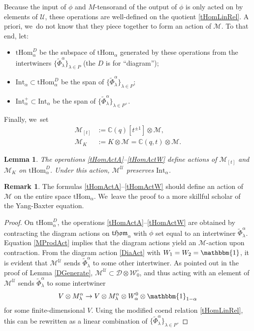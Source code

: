 \documentclass[JEP,XML,SOM,Unicode,published]{cedram}
\newtheorem{lem}[thm]{Lemma}
\theoremstyle{definition}
\newtheorem{rem}[thm]{Remark}
\newcommand{\CC}{\mathbb{C}}
\newcommand{\UU}{\mathcal{U}}
\newcommand{\DD}{\mathcal{D}}
\newcommand{\WW}{\mathcal{W}}
\newcommand{\WWo}{\WW^\circ}
\newcommand{\MM}{\mathcal{M}}
\begin{document}
Because the input of $\phi$ and $M$-tensorand of the output of $\phi$ is only acted on by elements of $\UU$, these operations are well-defined on the quotient \eqref{tHomLinRel}.
{A priori}, we~do not know that they piece together to form an action of $\MM$.
To that end, let:
\begin{itemize}
\item $\mathrm{tHom}_\alpha^{D}$ be the subspace of $\mathrm{tHom}_\alpha$ generated by these operations from the intertwiners $\{ \widetilde{\Phi}_{\lambda}^\alpha \}_{\lambda\in P}$ (the $D$ is for ``diagram'');
\item $\mathrm{Int}_\alpha\subset\mathrm{tHom}_\alpha^{D}$ be the span of $\{ \widetilde{\Phi}_{\lambda}^\alpha \}_{\lambda\in P}$;
\item $\mathrm{Int}_\alpha^+\subset\mathrm{Int}_\alpha$ be the span of $\{\widetilde{\Phi}_\lambda^\alpha\}_{\lambda\in P^+}$.
\end{itemize}
Finally, we~set
\begin{align*}
\MM_{[t]}&:= \CC(q)[t^{\pm 1}] \otimes\MM,\\
\MM_K&:= K\otimes\MM=\CC(q,t)\otimes\MM.
\end{align*}

\begin{lem}
The operations \eqref{tHomActA}--\eqref{tHomActW} define actions of $\MM_{[t]}$ and $\MM_K$ on $\mathrm{tHom}_\alpha^D$.
Under this action, $\MM^\UU$ preserves $\mathrm{Int}_\alpha$.
\end{lem}

\begin{rem}
The formulas \eqref{tHomActA}--\eqref{tHomActW} should define an action of $\MM$ on the entire space $\mathrm{tHom}_\alpha$. We~leave the proof to a more skillful scholar of the Yang-Baxter equation.
\end{rem}

\begin{proof}
On $\mathrm{tHom}_\alpha^D$, the operations \eqref{tHomActA}--\eqref{tHomActW} are obtained by contracting the diagram actions on $\mathfrak{tHom}_\alpha$ with $\phi$ set equal to an intertwiner $\widetilde{\Phi}_\lambda^\alpha$.
Equation \eqref{MProdAct} implies that the diagram actions yield an $\MM$-action upon contraction.
From the diagram action \eqref{DiaAct} with $W_1=W_2=\mathbbm{1}$, it is evident that $\MM^\UU$ sends $\widetilde{\Phi}_\lambda^\alpha$ to some other intertwiner.
As pointed out in the proof of Lemma \ref{DGenerate}, $\MM^\UU\subset\DD\otimes\WWo_0$, and thus acting with an element of $\MM^\UU$ sends $\widetilde{\Phi}_\lambda^\alpha$ to some intertwiner
\[
V\otimes M_{\lambda}^{\alpha}\to V\otimes M_{\lambda}^{\alpha}\otimes W_{\alpha}^0\otimes\mathbbm{1}_{1-\alpha}
\]
for some finite-dimensional $V$.
Using the modified coend relation \eqref{tHomLinRel}, this can be rewritten as a linear combination of $\{\widetilde{\Phi}_\lambda^\alpha\}_{\lambda\in P}$.
\end{proof}
\end{document}
